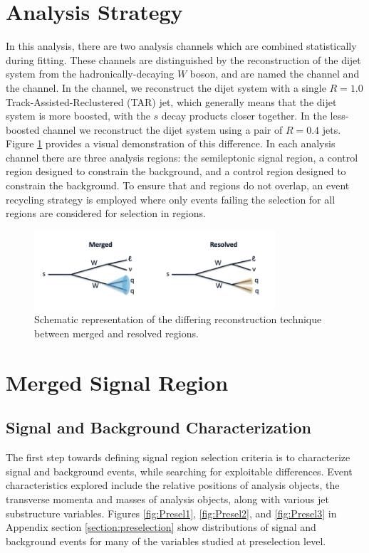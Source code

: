 \section{Analysis Strategy}
\label{section:ana_strat}
In this analysis, there are two analysis channels which are combined statistically during fitting. These channels are distinguished by the reconstruction of the dijet system from the hadronically-decaying $W$ boson, and are named the \merged channel and the \resolved channel. In the \merged channel, we reconstruct the dijet system with a single $R=1.0$ Track-Assisted-Reclustered (TAR) jet, which generally means that the dijet system is more boosted, with the $s$ decay products closer together. In the less-boosted \resolved channel we reconstruct the dijet system using a pair of $R=0.4$ jets. Figure \ref{fig:mgd_res} provides a visual demonstration of this difference. In each analysis channel there are three analysis regions: the semileptonic signal region, a control region designed to constrain the \ttbar background, and a control region designed to constrain the \wjets background. To ensure that \merged and \resolved regions do not overlap, an event recycling strategy is employed where only events failing the selection for all \merged regions are considered for selection in \resolved regions.

\begin{figure}[h!]
    \centering
    \includegraphics[width=0.8\textwidth]{Figures/4/mgd_res.png}
    \caption{Schematic representation of the differing reconstruction technique between merged and resolved regions.}
    \label{fig:mgd_res}
\end{figure}

\section{Merged Signal Region}
\label{section:sr_merged}
\subsection{Signal and Background Characterization}
The first step towards defining signal region selection criteria is to characterize signal and background events, while searching for exploitable differences. Event characteristics explored include the relative positions of analysis objects, the transverse momenta and masses of analysis objects, along with various jet substructure variables. Figures \ref{fig:Presel1}, \ref{fig:Presel2}, and \ref{fig:Presel3} in Appendix section \ref{section:preselection} show distributions of signal and background events for many of the variables studied at preselection level.

